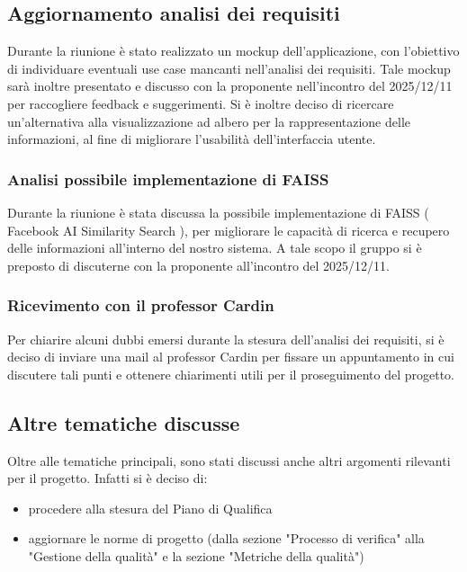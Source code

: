 \documentclass[a4paper,12pt]{article}
\begin{document}
\subsection{Aggiornamento analisi dei requisiti}
Durante la riunione è stato realizzato un mockup dell'applicazione, con l'obiettivo di individuare eventuali use case mancanti nell'analisi dei requisiti. 
Tale mockup sarà inoltre presentato e discusso con la proponente nell'incontro del 2025/12/11 per raccogliere feedback e suggerimenti. 
Si è inoltre deciso di ricercare un'alternativa alla visualizzazione ad albero per la rappresentazione delle informazioni, al fine di migliorare l'usabilità dell'interfaccia utente.

\subsubsection{Analisi possibile implementazione di FAISS}
Durante la riunione è stata discussa la possibile implementazione di FAISS ( Facebook AI Similarity Search ), per migliorare le capacità di ricerca e recupero delle informazioni all'interno del nostro sistema.
A tale scopo il gruppo si è preposto di discuterne con la proponente all'incontro del 2025/12/11.

\subsubsection{Ricevimento con il professor Cardin}Per chiarire alcuni dubbi emersi durante la stesura dell'analisi dei requisiti, si è deciso di inviare una mail 
al professor Cardin per fissare un appuntamento in cui discutere tali punti e ottenere chiarimenti utili per il proseguimento del progetto.

\subsection{Altre tematiche discusse}
Oltre alle tematiche principali, sono stati discussi anche altri argomenti rilevanti per il progetto. Infatti si è deciso di:
\begin{itemize}
    \item procedere alla stesura del Piano di Qualifica
    \item aggiornare le norme di progetto (dalla sezione "Processo di verifica" alla "Gestione della qualità" e la sezione "Metriche della qualità")
\end{itemize}
\end{document}
